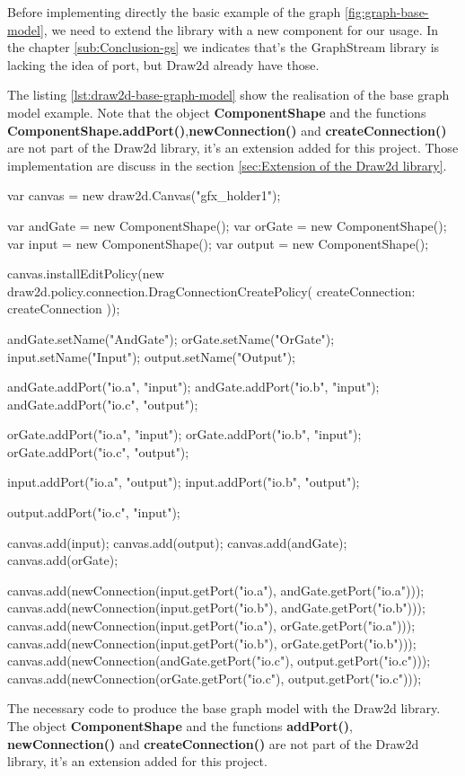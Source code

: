 Before implementing directly the basic example of the graph \ref{fig:graph-base-model},
we need to extend the library with a new component for our usage.
In the chapter \ref{sub:Conclusion-gs} we indicates that's the GraphStream library is lacking the idea of port, but Draw2d already have those.

The listing \ref{lst:draw2d-base-graph-model} show the realisation of the base graph model example.
Note that the object \textbf{ComponentShape} and the functions \textbf{ComponentShape.addPort()},\textbf{newConnection()} and
\textbf{createConnection()} are not part of the Draw2d library, it's an extension added for this project. Those implementation are discuss in the section \ref{sec:Extension of the Draw2d library}.

\begin{listing}[p]%
    \centering
    \begin{jscode}
    var canvas = new draw2d.Canvas("gfx_holder1");

    var andGate = new ComponentShape();
    var orGate = new ComponentShape();
    var input = new ComponentShape();
    var output = new ComponentShape();

    canvas.installEditPolicy(new draw2d.policy.connection.DragConnectionCreatePolicy({
        createConnection: createConnection
    }));

    andGate.setName("AndGate");
    orGate.setName("OrGate");
    input.setName("Input");
    output.setName("Output");

    andGate.addPort("io.a", "input");
    andGate.addPort("io.b", "input");
    andGate.addPort("io.c", "output");

    orGate.addPort("io.a", "input");
    orGate.addPort("io.b", "input");
    orGate.addPort("io.c", "output");

    input.addPort("io.a", "output");
    input.addPort("io.b", "output");

    output.addPort("io.c", "input");

    canvas.add(input);
    canvas.add(output);
    canvas.add(andGate);
    canvas.add(orGate);

    canvas.add(newConnection(input.getPort("io.a"), andGate.getPort("io.a")));
    canvas.add(newConnection(input.getPort("io.b"), andGate.getPort("io.b")));
    canvas.add(newConnection(input.getPort("io.a"), orGate.getPort("io.a")));
    canvas.add(newConnection(input.getPort("io.b"), orGate.getPort("io.b")));
    canvas.add(newConnection(andGate.getPort("io.c"), output.getPort("io.c")));
    canvas.add(newConnection(orGate.getPort("io.c"), output.getPort("io.c")));
    \end{jscode}

    \caption[Base graph model implementation using the Draw2D library]{The necessary code to produce the base graph model with the Draw2d library.
    The object \textbf{ComponentShape} and the functions \textbf{addPort()},  \textbf{newConnection()} and \textbf{createConnection()} are not part of the Draw2d library, it's an extension added for this project.}

    \label{lst:draw2d-base-graph-model}
\end{listing}%

